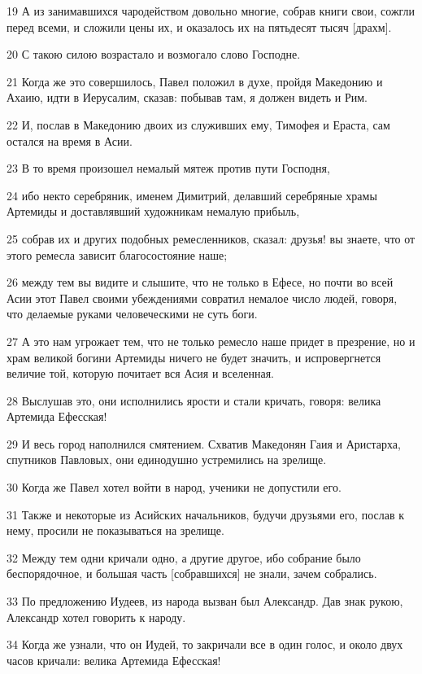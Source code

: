 \par 19 А из занимавшихся чародейством довольно многие, собрав книги свои, сожгли перед всеми, и сложили цены их, и оказалось их на пятьдесят тысяч [драхм].
\par 20 С такою силою возрастало и возмогало слово Господне.
\par 21 Когда же это совершилось, Павел положил в духе, пройдя Македонию и Ахаию, идти в Иерусалим, сказав: побывав там, я должен видеть и Рим.
\par 22 И, послав в Македонию двоих из служивших ему, Тимофея и Ераста, сам остался на время в Асии.
\par 23 В то время произошел немалый мятеж против пути Господня,
\par 24 ибо некто серебряник, именем Димитрий, делавший серебряные храмы Артемиды и доставлявший художникам немалую прибыль,
\par 25 собрав их и других подобных ремесленников, сказал: друзья! вы знаете, что от этого ремесла зависит благосостояние наше;
\par 26 между тем вы видите и слышите, что не только в Ефесе, но почти во всей Асии этот Павел своими убеждениями совратил немалое число людей, говоря, что делаемые руками человеческими не суть боги.
\par 27 А это нам угрожает тем, что не только ремесло наше придет в презрение, но и храм великой богини Артемиды ничего не будет значить, и испровергнется величие той, которую почитает вся Асия и вселенная.
\par 28 Выслушав это, они исполнились ярости и стали кричать, говоря: велика Артемида Ефесская!
\par 29 И весь город наполнился смятением. Схватив Македонян Гаия и Аристарха, спутников Павловых, они единодушно устремились на зрелище.
\par 30 Когда же Павел хотел войти в народ, ученики не допустили его.
\par 31 Также и некоторые из Асийских начальников, будучи друзьями его, послав к нему, просили не показываться на зрелище.
\par 32 Между тем одни кричали одно, а другие другое, ибо собрание было беспорядочное, и большая часть [собравшихся] не знали, зачем собрались.
\par 33 По предложению Иудеев, из народа вызван был Александр. Дав знак рукою, Александр хотел говорить к народу.
\par 34 Когда же узнали, что он Иудей, то закричали все в один голос, и около двух часов кричали: велика Артемида Ефесская!
